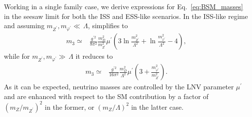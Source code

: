 Working in a single family case, we derive expressions for Eq.~\ref{eq:BSM_masses} in the seesaw limit for both the ISS and ESS-like scenarios. %
In the ISS-like regime and assuming $m_{Z^\prime}, m_{\varphi^\prime} \ll \, \Lambda$,  simplifies to
%
\begin{align} \label{eq:ISSlimit_1}
m_3 \simeq& \frac{g^{\prime 2}}{8\pi^2} \frac{m_D^2}{m_{Z^\prime}^2} \mu^\prime  \left( {3 \ln{\frac{m_{Z^\prime}^2}{\Lambda^2}} + \ln{\frac{m_{\varphi^\prime}^2}{\Lambda^2}} - 4 }\right),
\end{align}
%
while for $m_{Z^\prime}, m_{\varphi^\prime} \gg \, \Lambda$ it reduces to 
%
\begin{align} \label{eq:ISSlimit_2}
m_3 \simeq& \frac{g^{\prime 2}}{16\pi^2} \frac{m_D^2}{\Lambda^2} \mu^\prime \left( 3 + \frac{m_{\varphi^\prime}^2}{m_{Z^\prime}^2} \right).
\end{align}
%
As it can be expected, neutrino masses are controlled by the LNV parameter $\mu^\prime$ and are enhanced with respect to the SM contribution by a factor of $(m_Z/m_{Z^\prime})^2$ in the former, or $(m_Z/\Lambda)^2$ in the latter case. 

